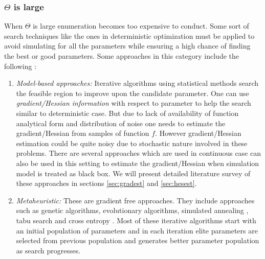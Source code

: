 \subsubsection{$\Theta$ is large}
When $\Theta$ is large enumeration becomes too expensive to conduct. Some sort of search techniques like the ones in deterministic optimization must be applied to avoid simulating for all the parameters while ensuring a high chance of finding the best or good parameters. Some approaches in this category include the following : 
\begin{enumerate}
\item \emph{Model-based approaches:} Iterative algorithms using statistical methods search the feasible region to improve upon the candidate parameter. One can  use \emph{gradient/Hessian information} with respect to parameter to help the search similar to deterministic case. But due to lack of availability of function analytical form and distribution of noise one needs to estimate the gradient/Hessian from samples of function $f$. However gradient/Hessian  estimation could be  quite noisy due to stochastic nature involved  in these problems. There are several approaches  which are used in continuous case can also be used in this setting to estimate the gradient/Hessian when simulation model is treated as black box. We will present detailed literature survey of these approaches in sections \ref{sec:gradest} and \ref{sec:hesest}. 
\item \emph{Metaheuristic:} These are gradient free approaches. They include approaches such as genetic algorithms, evolutionary algorithms, simulated annealing \cite{simann}, tabu search \cite{tabu} and cross entropy \cite{crossent}. Most of these iterative algorithms start with an initial population of parameters and in each iteration elite parameters are selected from previous population and generates  better parameter population as search progresses. 
\end{enumerate}


